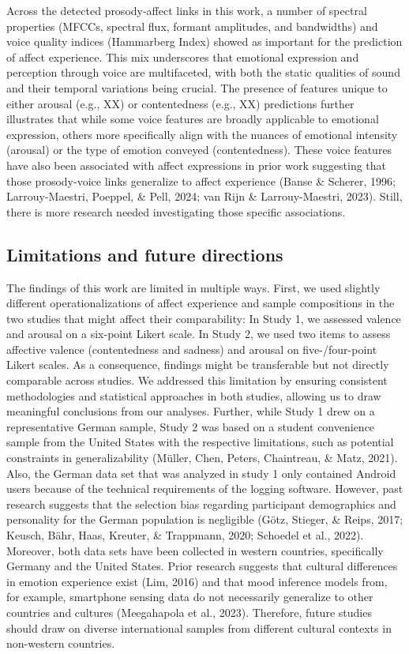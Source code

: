 \documentclass[
  english,
  man,floatsintext]{apa6}
\begin{document}
Across the detected prosody-affect links in this work, a number of spectral properties (MFCCs, spectral flux, formant amplitudes, and bandwidths) and voice quality indices (Hammarberg Index) showed as important for the prediction of affect experience. This mix underscores that emotional expression and perception through voice are multifaceted, with both the static qualities of sound and their temporal variations being crucial. The presence of features unique to either arousal (e.g., XX) or contentedness (e.g., XX) predictions further illustrates that while some voice features are broadly applicable to emotional expression, others more specifically align with the nuances of emotional intensity (arousal) or the type of emotion conveyed (contentedness). These voice features have also been associated with affect expressions in prior work suggesting that those prosody-voice links generalize to affect experience (Banse \& Scherer, 1996; Larrouy-Maestri, Poeppel, \& Pell, 2024; van Rijn \& Larrouy-Maestri, 2023). Still, there is more research needed investigating those specific associations.

\hypertarget{limitations-and-future-directions}{%
\subsection{Limitations and future directions}\label{limitations-and-future-directions}}

The findings of this work are limited in multiple ways. First, we used slightly different operationalizations of affect experience and sample compositions in the two studies that might affect their comparability: In Study 1, we assessed valence and arousal on a six-point Likert scale. In Study 2, we used two items to assess affective valence (contentedness and sadness) and arousal on five-/four-point Likert scales. As a consequence, findings might be transferable but not directly comparable across studies. We addressed this limitation by ensuring consistent methodologies and statistical approaches in both studies, allowing us to draw meaningful conclusions from our analyses. Further, while Study 1 drew on a representative German sample, Study 2 was based on a student convenience sample from the United States with the respective limitations, such as potential constraints in generalizability (Müller, Chen, Peters, Chaintreau, \& Matz, 2021). Also, the German data set that was analyzed in study 1 only contained Android users because of the technical requirements of the logging software. However, past research suggests that the selection bias regarding participant demographics and personality for the German population is negligible (Götz, Stieger, \& Reips, 2017; Keusch, Bähr, Haas, Kreuter, \& Trappmann, 2020; Schoedel et al., 2022). Moreover, both data sets have been collected in western countries, specifically Germany and the United States. Prior research suggests that cultural differences in emotion experience exist (Lim, 2016) and that mood inference models from, for example, smartphone sensing data do not necessarily generalize to other countries and cultures (Meegahapola et al., 2023). Therefore, future studies should draw on diverse international samples from different cultural contexts in non-western countries.
\end{document}
